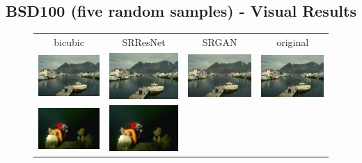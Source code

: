 \documentclass[10pt,twocolumn,letterpaper]{article}
\begin{document}
\subsection{BSD100 (five random samples) - Visual Results}
\label{app:BSD100}
\begin{figure}[h!] 
  	\begin{tabular}{cccc}
  		 bicubic & SRResNet & SRGAN & original \\
     	\includegraphics[width=1.5in]{images/used/appendix/jpg/BSD100/219090_bicubic}&
     	\includegraphics[width=1.5in]{images/used/appendix/jpg/BSD100/219090_SRResNet-MSE} &
     	\includegraphics[width=1.5in]{images/used/appendix/jpg/BSD100/219090_SRGAN-VGG54} &
     	\includegraphics[width=1.5in]{images/used/appendix/jpg/BSD100/219090_HR} \\     	
     	\includegraphics[width=1.5in]{images/used/appendix/jpg/BSD100/45096_bicubic}&
     	\includegraphics[width=1.5in]{images/used/appendix/jpg/BSD100/45096_SRResNet-MSE} &

\end{tabular}
\end{figure}
\end{document}
